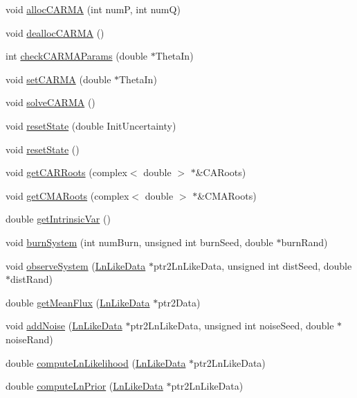 \begin{DoxyCompactItemize}
\item 
void \hyperlink{class_c_a_r_m_a_a6f96e596ba4a66b3f9eb7234292ad1d0}{alloc\-C\-A\-R\-M\-A} (int num\-P, int num\-Q)
\item 
void \hyperlink{class_c_a_r_m_a_af850b7e2ba5af3ae028aacfc0891b830}{dealloc\-C\-A\-R\-M\-A} ()
\item 
int \hyperlink{class_c_a_r_m_a_a20702c73019e9eafae573df3df0128d3}{check\-C\-A\-R\-M\-A\-Params} (double $\ast$Theta\-In)
\item 
void \hyperlink{class_c_a_r_m_a_a6c1c104dcf44e34fb596c6068239347e}{set\-C\-A\-R\-M\-A} (double $\ast$Theta\-In)
\item 
void \hyperlink{class_c_a_r_m_a_ad4391fa9d2ae5f6673b9ac762fd1795a}{solve\-C\-A\-R\-M\-A} ()
\item 
void \hyperlink{class_c_a_r_m_a_a8748732c23bc65486b9df8f25a905cf9}{reset\-State} (double Init\-Uncertainty)
\item 
void \hyperlink{class_c_a_r_m_a_a44b60949dc1cbcccb24873a117faa5ac}{reset\-State} ()
\item 
void \hyperlink{class_c_a_r_m_a_a98f282f6809e1e2c19ed10b362048fdc}{get\-C\-A\-R\-Roots} (complex$<$ double $>$ $\ast$\&C\-A\-Roots)
\item 
void \hyperlink{class_c_a_r_m_a_aead4fd2cb0a4f1670e866435a09e0d50}{get\-C\-M\-A\-Roots} (complex$<$ double $>$ $\ast$\&C\-M\-A\-Roots)
\item 
double \hyperlink{class_c_a_r_m_a_a2950241c0e1f1157e5b2d07e497e9b14}{get\-Intrinsic\-Var} ()
\item 
void \hyperlink{class_c_a_r_m_a_a684661827088a58ccc3131184e7506ba}{burn\-System} (int num\-Burn, unsigned int burn\-Seed, double $\ast$burn\-Rand)
\item 
void \hyperlink{class_c_a_r_m_a_a9c4a1c1471281a20e9dabc3b8a7ae527}{observe\-System} (\hyperlink{struct_ln_like_data}{Ln\-Like\-Data} $\ast$ptr2\-Ln\-Like\-Data, unsigned int dist\-Seed, double $\ast$dist\-Rand)
\item 
double \hyperlink{class_c_a_r_m_a_a44e19a15aba1f78becebc2d01a6a3a97}{get\-Mean\-Flux} (\hyperlink{struct_ln_like_data}{Ln\-Like\-Data} $\ast$ptr2\-Data)
\item 
void \hyperlink{class_c_a_r_m_a_a8dab0a97d457c89d11727fcc664fd3f3}{add\-Noise} (\hyperlink{struct_ln_like_data}{Ln\-Like\-Data} $\ast$ptr2\-Ln\-Like\-Data, unsigned int noise\-Seed, double $\ast$noise\-Rand)
\item 
double \hyperlink{class_c_a_r_m_a_af8f65514684e13060bf6614d2401c3dd}{compute\-Ln\-Likelihood} (\hyperlink{struct_ln_like_data}{Ln\-Like\-Data} $\ast$ptr2\-Ln\-Like\-Data)
\item 
double \hyperlink{class_c_a_r_m_a_aec6ca9d09edc9a5a4a69c4ccec69a6a3}{compute\-Ln\-Prior} (\hyperlink{struct_ln_like_data}{Ln\-Like\-Data} $\ast$ptr2\-Ln\-Like\-Data)
\end{DoxyCompactItemize}


